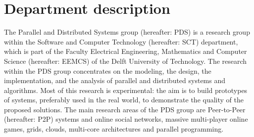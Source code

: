 \section{Department description}
The Parallel and Distributed Systems group (hereafter: PDS) is a research group within the Software and Computer Technology (hereafter: SCT) department, which is part of the Faculty Electrical Engineering, Mathematics and Computer Science (hereafter: EEMCS) of the Delft University of Technology. The research within the PDS group concentrates on the modeling, the design, the implementation, and the analysis of parallel and distributed systems and algorithms. Most of this research is experimental: the aim is to build prototypes of systems, preferably used in the real world, to demonstrate the quality of the proposed solutions. The main research areas of the PDS group are Peer-to-Peer (hereafter: P2P) systems and online social networks, massive multi-player online games, grids, clouds, multi-core architectures and parallel programming. 
